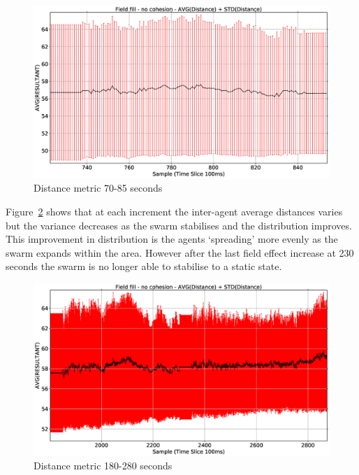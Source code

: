 \begin{figure}[H]
\begin{center}
\includegraphics[width=12cm]{CHAPTER-8/figures/REPELFILL5055-DIST-1-2}
\end{center}
\caption{Distance metric 70-85 seconds\label{emerge:REPELFILL5055-DIST-1-2}}
\end{figure}

Figure~\ref{emerge:REPELFILL5055-DIST-2-3} shows that at each increment the inter-agent average distances varies but the variance decreases as the swarm stabilises and the distribution improves. This improvement in distribution is the agents `spreading' more evenly as the swarm expands within the area. However after the last field effect increase at 230 seconds the swarm is no longer able to stabilise to a static state. 

\begin{figure}[H]
\begin{center}
\includegraphics[width=12cm]{CHAPTER-8/figures/REPELFILL5055-DIST-2-3}
\end{center}
\caption{Distance metric 180-280 seconds\label{emerge:REPELFILL5055-DIST-2-3}}
\end{figure}


